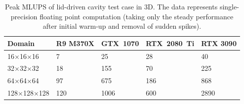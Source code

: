 \begin{table}[!ht]
	\centering\small
	{\renewcommand{\arraystretch}{1.1}%
		{\setlength{\tabcolsep}{0.5em}
	\begin{tabular}{ |p{3.2cm}||p{2.2cm}|p{2.2cm}|p{2.4cm}|p{2.2cm}|  }
		\hline
		Domain & R9 M370X & GTX~1070 & RTX~2080~Ti & RTX 3090 \\
		\hline
		16$\times$16$\times$16   & 7 & 25  & 28  & 40  \\
		\hline
		32$\times$32$\times$32   & 18 & 155  & 70   & 225  \\
		\hline
		64$\times$64$\times$64   & 97 & 675  & 186   & 868  \\
		\hline
		128$\times$128$\times$128   & 120 & 1006  & 600   & 2890  \\
		\hline
	\end{tabular}}}
	\caption{Peak MLUPS of lid-driven cavity test case in 3D. The data represents single-precision floating point computation (taking only the steady performance after initial warm-up and removal of sudden spikes).}
	\label{tab:lid-mlups-all-3d}
\end{table}

